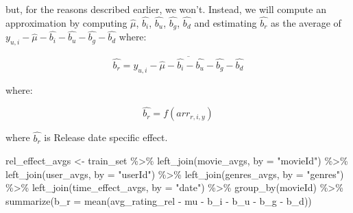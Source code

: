 \documentclass[
]{article}
\newenvironment{Shaded}{}{}
\newcommand{\AttributeTok}[1]{\textcolor[rgb]{0.49,0.56,0.16}{#1}}
\newcommand{\FunctionTok}[1]{\textcolor[rgb]{0.02,0.16,0.49}{#1}}
\newcommand{\NormalTok}[1]{#1}
\newcommand{\OtherTok}[1]{\textcolor[rgb]{0.00,0.44,0.13}{#1}}
\newcommand{\SpecialCharTok}[1]{\textcolor[rgb]{0.25,0.44,0.63}{#1}}
\newcommand{\StringTok}[1]{\textcolor[rgb]{0.25,0.44,0.63}{#1}}
\begin{document}
but, for the reasons described earlier, we won't. Instead, we will
compute an approximation by computing \(\hat{\mu}\), \(\hat{b_{i}}\),
\(\hat{b_{u}}\), \(\hat{b_{g}}\), \(\hat{b_{d}}\) and estimating
\(\hat{b_{r}}\) as the average of
\(y_{u,i}-\hat{\mu}-\hat{b_{i}}-\hat{b_{u}}-\hat{b_{g}}-\hat{b_{d}}\)
where:\\

%
\par

\label{eq:EqModel6-3} \begin{equation}
  \hat{b_{r}} = \overline{y_{u,i} - \hat{\mu} - \hat{b_{i}} - \hat{b_{u}}  - \hat{b_{g}} - \hat{b_{d}}}
\end{equation}

where:

%
\par

\label{eq:EqModel6-4} \begin{equation}
  \hat{b_{r}} = f(arr_{r,i,y})
\end{equation}

where \(\hat{b_{r}}\) is Release date specific effect.

\begin{Shaded}
\begin{Highlighting}[]
\NormalTok{rel\_effect\_avgs }\OtherTok{\textless{}{-}}\NormalTok{ train\_set }\SpecialCharTok{\%\textgreater{}\%} \FunctionTok{left\_join}\NormalTok{(movie\_avgs, }\AttributeTok{by =} \StringTok{"movieId"}\NormalTok{) }\SpecialCharTok{\%\textgreater{}\%} 
    \FunctionTok{left\_join}\NormalTok{(user\_avgs, }\AttributeTok{by =} \StringTok{"userId"}\NormalTok{) }\SpecialCharTok{\%\textgreater{}\%} \FunctionTok{left\_join}\NormalTok{(genres\_avgs, }
    \AttributeTok{by =} \StringTok{"genres"}\NormalTok{) }\SpecialCharTok{\%\textgreater{}\%} \FunctionTok{left\_join}\NormalTok{(time\_effect\_avgs, }\AttributeTok{by =} \StringTok{"date"}\NormalTok{) }\SpecialCharTok{\%\textgreater{}\%} 
    \FunctionTok{group\_by}\NormalTok{(movieId) }\SpecialCharTok{\%\textgreater{}\%} \FunctionTok{summarize}\NormalTok{(}\AttributeTok{b\_r =} \FunctionTok{mean}\NormalTok{(avg\_rating\_rel }\SpecialCharTok{{-}} 
\NormalTok{    mu }\SpecialCharTok{{-}}\NormalTok{ b\_i }\SpecialCharTok{{-}}\NormalTok{ b\_u }\SpecialCharTok{{-}}\NormalTok{ b\_g }\SpecialCharTok{{-}}\NormalTok{ b\_d))}
\end{Highlighting}
\end{Shaded}
\end{document}
